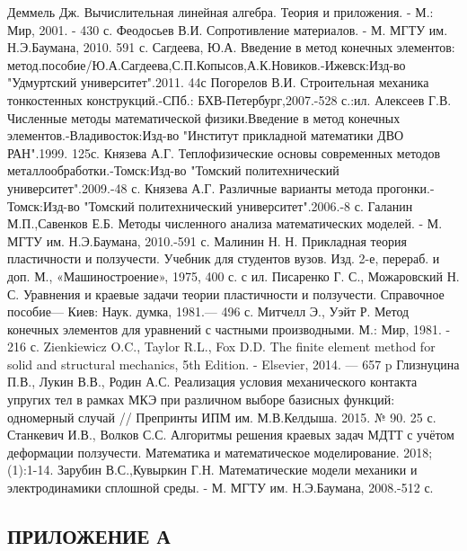\documentclass[a4paper, 14pt]{extarticle}
\begin{document}
\begin{thebibliography}{9}
  Деммель Дж. Вычислительная линейная алгебра. Теория и приложения. - М.: Мир, 2001. - 430 с.
  Феодосьев В.И. Сопротивление материалов. - М. МГТУ им. Н.Э.Баумана, 2010. 591 с.
  Сагдеева, Ю.А. Введение в метод конечных элементов: метод.пособие/Ю.А.Сагдеева,С.П.Копысов,А.К.Новиков.-Ижевск:Изд-во "Удмуртский университет".2011. 44с
  Погорелов В.И. Строительная механика тонкостенных конструкций.-СПб.: БХВ-Петербург,2007.-528 с.:ил.
  Алексеев Г.В. Численные методы математической физики.Введение в метод конечных элементов.-Владивосток:Изд-во "Институт прикладной математики ДВО РАН".1999. 125с.
  Князева А.Г. Теплофизические основы современных методов металлообработки.-Томск:Изд-во "Томский политехнический университет".2009.-48 с.
  Князева А.Г. Различные варианты метода прогонки.-Томск:Изд-во "Томский политехнический университет".2006.-8 с.
  Галанин М.П.,Савенков Е.Б. Методы численного анализа математических моделей. - М. МГТУ им. Н.Э.Баумана, 2010.-591 с.
  Малинин Н. Н. Прикладная теория пластичности и ползучести. Учебник для студентов вузов. Изд. 2-е, перераб. и доп. М., «Машиностроение», 1975, 400 с. с ил.
 Писаренко Г. С., Можаровский Н. С. Уравнения и краевые задачи теории пластичности и ползучести. Справочное пособие— Киев: Наук. думка, 1981.— 496 с.
 Митчелл Э., Уэйт Р. Метод конечных элементов для уравнений с частными производными. М.: Мир, 1981. - 216 с.
 Zienkiewicz O.C., Taylor R.L., Fox D.D. The finite element method for solid and structural mechanics, 5th Edition. - Elsevier, 2014. — 657 p
 Глизнуцина П.В., Лукин В.В., Родин А.С. Реализация условия механического контакта упругих тел в рамках МКЭ при различном выборе базисных функций: одномерный случай // Препринты ИПМ им. М.В.Келдыша. 2015. № 90. 25 с.
 Станкевич И.В., Волков С.С. Алгоритмы решения краевых задач МДТТ с учётом деформации ползучести. Математика и математическое моделирование. 2018;(1):1-14.
  Зарубин В.С.,Кувыркин Г.Н. Математические модели механики и электродинамики сплошной среды. - М. МГТУ им. Н.Э.Баумана, 2008.-512 с.
\end{thebibliography}

\newpage

\begin{center}
\section*{\centering ПРИЛОЖЕНИЕ А}
\end{center}
\end{document}
